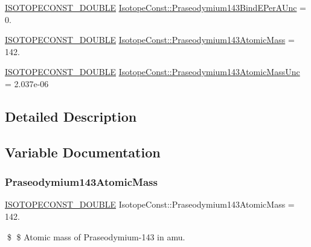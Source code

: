 \begin{DoxyCompactItemize}
\item 
\mbox{\hyperlink{group___isotope_const-_macros_ga8f45a7272ce02c0b4c65c44636ed719a}{I\+S\+O\+T\+O\+P\+E\+C\+O\+N\+S\+T\+\_\+\+D\+O\+U\+B\+LE}} \mbox{\hyperlink{group___isotope_const-_praseodymium-_pr143_ga0a3f4a63dd8d2c69bd5f6ae72b382427}{Isotope\+Const\+::\+Praseodymium143\+Bind\+E\+Per\+A\+Unc}} = 0.
\item 
\mbox{\hyperlink{group___isotope_const-_macros_ga8f45a7272ce02c0b4c65c44636ed719a}{I\+S\+O\+T\+O\+P\+E\+C\+O\+N\+S\+T\+\_\+\+D\+O\+U\+B\+LE}} \mbox{\hyperlink{group___isotope_const-_praseodymium-_pr143_ga28344c9573043a8165bf944b03b45f05}{Isotope\+Const\+::\+Praseodymium143\+Atomic\+Mass}} = 142.
\item 
\mbox{\hyperlink{group___isotope_const-_macros_ga8f45a7272ce02c0b4c65c44636ed719a}{I\+S\+O\+T\+O\+P\+E\+C\+O\+N\+S\+T\+\_\+\+D\+O\+U\+B\+LE}} \mbox{\hyperlink{group___isotope_const-_praseodymium-_pr143_ga49b37d9762c675ce236e0ffba4bc41da}{Isotope\+Const\+::\+Praseodymium143\+Atomic\+Mass\+Unc}} = 2.\+037e-\/06
\end{DoxyCompactItemize}


\subsection{Detailed Description}


\subsection{Variable Documentation}
\mbox{\label{group___isotope_const-_praseodymium-_pr143_ga28344c9573043a8165bf944b03b45f05}} 
\subsubsection{\texorpdfstring{Praseodymium143\+Atomic\+Mass}{Praseodymium143AtomicMass}}
{\footnotesize\ttfamily \mbox{\hyperlink{group___isotope_const-_macros_ga8f45a7272ce02c0b4c65c44636ed719a}{I\+S\+O\+T\+O\+P\+E\+C\+O\+N\+S\+T\+\_\+\+D\+O\+U\+B\+LE}} Isotope\+Const\+::\+Praseodymium143\+Atomic\+Mass = 142.}

\$ \$ Atomic mass of Praseodymium-\/143 in amu. \mbox{\label{group___isotope_const-_praseodymium-_pr143_ga49b37d9762c675ce236e0ffba4bc41da}} 
